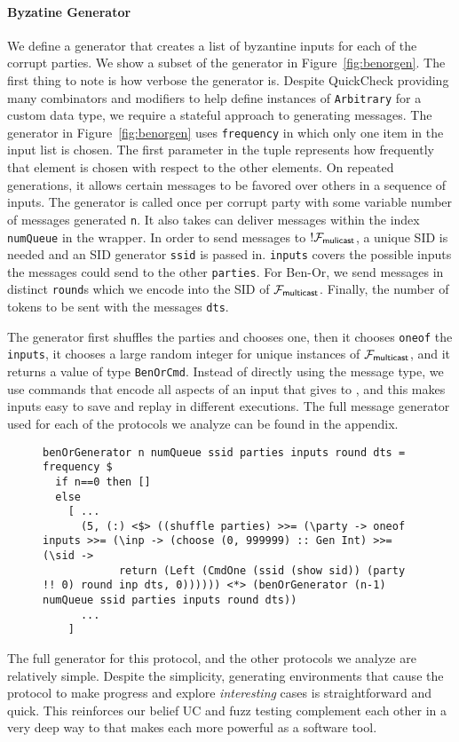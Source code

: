 \paragraph{Byzatine Generator}
We define a generator that creates a list of byzantine inputs for each of the corrupt parties.
We show a subset of the generator in Figure~\ref{fig:benorgen}.
The first thing to note is how verbose the generator is.
Despite QuickCheck providing many combinators and modifiers to help define instances of \texttt{Arbitrary} for a custom data type, we require a stateful approach to generating messages.
The generator in Figure~\ref{fig:benorgen} uses \texttt{frequency} in which only one item in the input list is chosen. 
The first parameter in the tuple represents how frequently that element is chosen with respect to the other elements.
On repeated generations, it allows certain messages to be favored over others in a sequence of inputs.
The generator is called once per corrupt party with some variable number of messages generated \texttt{n}. It also takes can deliver messages within the index \texttt{numQueue} in the wrapper.
In order to send messages to $!\mathcal{F}_{{\mathsf {mulicast}}}$, a unique SID is needed and an SID generator \texttt{ssid} is passed in. 
\texttt{inputs} covers the possible inputs the messages could send to the other \texttt{parties}. For Ben-Or, we send messages in distinct \texttt{round}s which we encode into the SID of $\mathcal{F}_{{\mathsf {multicast}}}$. 
Finally, the number of tokens to be sent with the messages \texttt{dts}.

The generator first shuffles the parties and chooses one, then it chooses \texttt{oneof} the \texttt{inputs}, it chooses a large random integer for unique instances of $\mathcal{F}_{{\mathsf {multicast}}}$, and it returns a value of type \texttt{BenOrCmd}.
Instead of directly using the message type, we use commands that encode all aspects of an input that \Z gives to \A, and this makes inputs easy to save and replay in different executions.
The full message generator used for each of the protocols we analyze can be found in the appendix.
\begin{figure*}
\begin{lstlisting}
benOrGenerator n numQueue ssid parties inputs round dts = frequency $
  if n==0 then []
  else  
 	[ ...
      (5, (:) <$> ((shuffle parties) >>= (\party -> oneof inputs >>= (\inp -> (choose (0, 999999) :: Gen Int) >>= (\sid -> 
            return (Left (CmdOne (ssid (show sid)) (party !! 0) round inp dts, 0)))))) <*> (benOrGenerator (n-1) numQueue ssid parties inputs round dts))
      ...
    ]
\end{lstlisting}
\end{figure*}
The full generator for this protocol, and the other protocols we analyze are relatively simple. 
Despite the simplicity, generating environments that cause the protocol to make progress and explore \emph{interesting} cases is straightforward and quick.
This reinforces our belief UC and fuzz testing complement each other in a very deep way to that makes each more powerful as a software tool. 

